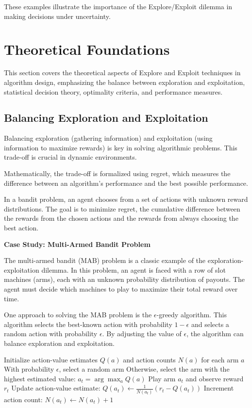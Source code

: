 \documentclass[12pt]{book} %
\begin{document}
These examples illustrate the importance of the Explore/Exploit dilemma in making decisions under uncertainty.


\section{Theoretical Foundations}

This section covers the theoretical aspects of Explore and Exploit techniques in algorithm design, emphasizing the balance between exploration and exploitation, statistical decision theory, optimality criteria, and performance measures.

\subsection{Balancing Exploration and Exploitation}

Balancing exploration (gathering information) and exploitation (using information to maximize rewards) is key in solving algorithmic problems. This trade-off is crucial in dynamic environments.

Mathematically, the trade-off is formalized using regret, which measures the difference between an algorithm's performance and the best possible performance. 

In a bandit problem, an agent chooses from a set of actions with unknown reward distributions. The goal is to minimize regret, the cumulative difference between the rewards from the chosen actions and the rewards from always choosing the best action.


\textbf{Case Study: Multi-Armed Bandit Problem}

The multi-armed bandit (MAB) problem is a classic example of the exploration-exploitation dilemma. In this problem, an agent is faced with a row of slot machines (arms), each with an unknown probability distribution of payouts. The agent must decide which machines to play to maximize their total reward over time.

One approach to solving the MAB problem is the $\epsilon$-greedy algorithm. This algorithm selects the best-known action with probability $1-\epsilon$ and selects a random action with probability $\epsilon$. By adjusting the value of $\epsilon$, the algorithm can balance exploration and exploitation.
\FloatBarrier
\begin{algorithm}
\caption{$\epsilon$-Greedy Algorithm for Multi-Armed Bandit}
\begin{algorithmic}[1]
\State Initialize action-value estimates $Q(a)$ and action counts $N(a)$ for each arm $a$
    \State With probability $\epsilon$, select a random arm
    \State Otherwise, select the arm with the highest estimated value: $a_t = \arg\max_a Q(a)$
    \State Play arm $a_t$ and observe reward $r_t$
    \State Update action-value estimate: $Q(a_t) \leftarrow \frac{1}{N(a_t)}(r_t - Q(a_t))$
    \State Increment action count: $N(a_t) \leftarrow N(a_t) + 1$
\EndFor
\end{algorithmic}
\end{algorithm}
\FloatBarrier
\end{document}
